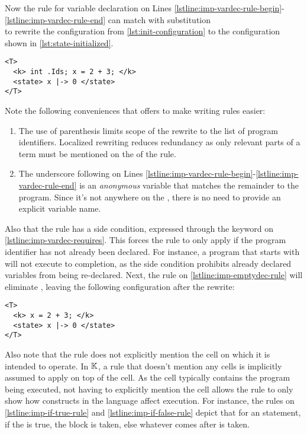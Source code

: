 Now the rule for variable declaration on
Lines \ref{lstline:imp-vardec-rule-begin}-\ref{lstline:imp-vardec-rule-end}
can match with substitution \\
to rewrite the configuration from \autoref{lst:init-configuration} to the configuration shown in \autoref{lst:state-initialized}.
\begin{lstlisting}[float=h!,language=k,style=ksty,frame=single,label=lst:state-initialized,caption={Configuration
with Variables Declared}]
<T>
  <k> int .Ids; x = 2 + 3; </k>
  <state> x |-> 0 </state>
</T>
\end{lstlisting}

\newpage

Note the following conveniences that \K{} offers to make writing rules easier:
\begin{enumerate}[label=\roman*)]
  \item The use of parenthesis limits scope of the rewrite to the
    list of program identifiers. Localized rewriting reduces redundancy
    as only relevant parts of a term must be mentioned on the \RHS{} of the
    rule.
  \item The underscore \inlinek{_} following 
    on Lines \ref{lstline:imp-vardec-rule-begin}-\ref{lstline:imp-vardec-rule-end}
    is an \emph{anonymous} variable that matches the remainder to the program.
    Since it's not anywhere on the \RHS{}, there is no need to provide an
    explicit variable name.
\end{enumerate}
Also that the rule has a side condition, expressed through the keyword 
on \autoref{lstline:imp-vardec-requires}. This forces the rule to only apply if
the program identifier has not already been declared. For instance,
a program that starts with  will not execute to completion,
as the side condition prohibits already declared variables from being
re-declared.
Next, the rule on \autoref{lstline:imp-emptydec-rule} will eliminate
, leaving the following configuration after the rewrite:
\begin{lstlisting}[language=k,style=ksty]
<T>
  <k> x = 2 + 3; </k>
  <state> x |-> 0 </state>
</T>
\end{lstlisting}
Also note that the rule does not explicitly mention the cell on which
it is intended to operate. In $\mathbb{K}$, a rule that doesn't
mention any cells is implicitly assumed to apply on top of the
 cell. As the  cell typically
contains the program being executed, not having to explicitly
mention the cell allows the rule to only show how constructs in the language
affect execution. For instance, the rules on \autoref{lstline:imp-if-true-rule}
and \autoref{lstline:imp-if-false-rule} depict that for an
 statement,
if the  is true, the  block is taken,
else whatever comes after is taken.

